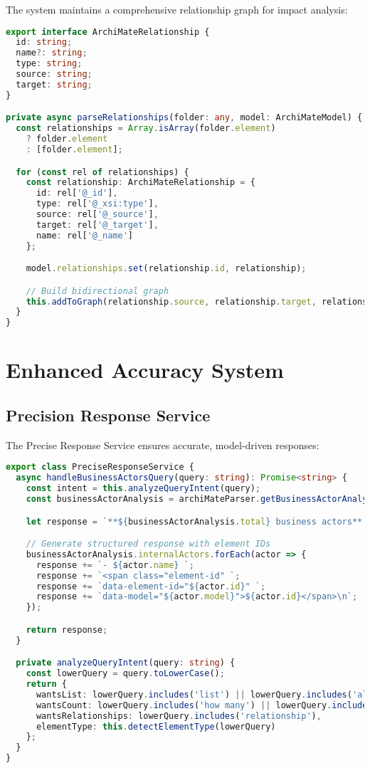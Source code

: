 \documentclass[12pt,a4paper]{report}
\begin{document}
The system maintains a comprehensive relationship graph for impact analysis:

\begin{lstlisting}[language=TypeScript, caption=Relationship Processing]
export interface ArchiMateRelationship {
  id: string;
  name?: string;
  type: string;
  source: string;
  target: string;
}

private async parseRelationships(folder: any, model: ArchiMateModel) {
  const relationships = Array.isArray(folder.element)
    ? folder.element
    : [folder.element];

  for (const rel of relationships) {
    const relationship: ArchiMateRelationship = {
      id: rel['@_id'],
      type: rel['@_xsi:type'],
      source: rel['@_source'],
      target: rel['@_target'],
      name: rel['@_name']
    };

    model.relationships.set(relationship.id, relationship);

    // Build bidirectional graph
    this.addToGraph(relationship.source, relationship.target, relationship.type);
  }
}
\end{lstlisting}

\section{Enhanced Accuracy System}

\subsection{Precision Response Service}

The Precise Response Service ensures accurate, model-driven responses:

\begin{lstlisting}[language=TypeScript, caption=Precise Response Implementation]
export class PreciseResponseService {
  async handleBusinessActorsQuery(query: string): Promise<string> {
    const intent = this.analyzeQueryIntent(query);
    const businessActorAnalysis = archiMateParser.getBusinessActorAnalysis();

    let response = `**${businessActorAnalysis.total} business actors**:\n\n`;

    // Generate structured response with element IDs
    businessActorAnalysis.internalActors.forEach(actor => {
      response += `- ${actor.name} `;
      response += `<span class="element-id" `;
      response += `data-element-id="${actor.id}" `;
      response += `data-model="${actor.model}">${actor.id}</span>\n`;
    });

    return response;
  }

  private analyzeQueryIntent(query: string) {
    const lowerQuery = query.toLowerCase();
    return {
      wantsList: lowerQuery.includes('list') || lowerQuery.includes('all'),
      wantsCount: lowerQuery.includes('how many') || lowerQuery.includes('count'),
      wantsRelationships: lowerQuery.includes('relationship'),
      elementType: this.detectElementType(lowerQuery)
    };
  }
}
\end{lstlisting}
\end{document}
